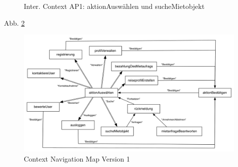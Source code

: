 \begin{figure}[H]
\centering
\hfill
{}
\hfill %
\hfill %
\caption{Inter. Context AP1: aktionAuswählen und sucheMietobjekt }
\label{interfaceContents1}
\end{figure}

Abb. \ref{fig:navigationmap1}
\begin{figure}[H]
\includegraphics[width=1\textwidth]{./images/navigationmap1.png}
\caption{Context Navigation Map Version 1}
\label{fig:navigationmap1}
\end{figure}



